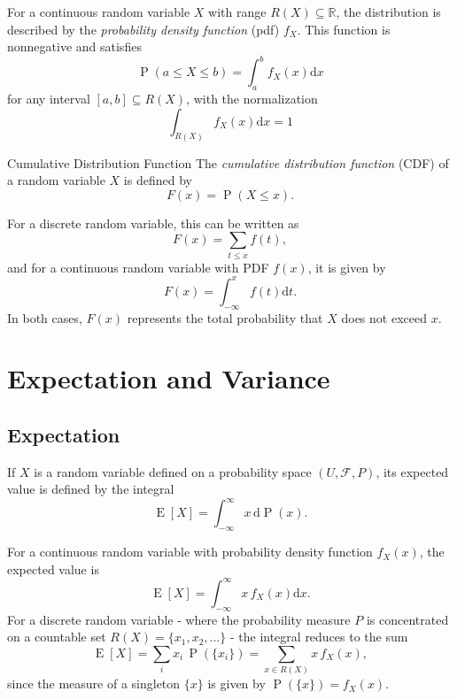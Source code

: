 \documentclass[11pt, headings=standardclasses, parskip=half, twoside]{scrartcl}
\newcommand{\dif}{\mathrm{d}}
\newcommand{\Prob}{\operatorname{P}}
\begin{document}
\begin{definition}{}
For a continuous random variable $X$ with range $R(X) \subseteq \mathbb{R}$, the distribution is described by the \textit{probability density function} (pdf) $f_{X}$. This function is nonnegative and satisfies
\[
\operatorname{P}(a \leq X \leq b)=\int_{a}^{b} f_{X}(x) \mathrm{d} x
\]
for any interval $[a, b] \subseteq R(X)$, with the normalization
\[
\int_{R(X)} f_{X}(x) \mathrm{d} x=1
\]
\end{definition}

\begin{definition}{Cumulative Distribution Function}{}
    The \textit{cumulative distribution function} (CDF) of a random variable $X$ is defined by
    \[
    F(x)=\operatorname{P}(X \leq x) .
    \]
\end{definition}

For a discrete random variable, this can be written as
\[
F(x)=\sum_{t \leq x} f(t),
\]
and for a continuous random variable with PDF $f(x)$, it is given by
\[
F(x)=\int_{-\infty}^{x} f(t) \mathrm{d} t .
\]
In both cases, $F(x)$ represents the total probability that $X$ does not exceed $x$.






\clearpage
\section{Expectation and Variance}

\subsection{Expectation}

\begin{definition}{}
    If $X$ is a random variable defined on a probability space $(U, \mathcal{F}, P)$, its expected value is defined by the integral
    \[
    \operatorname{E}[X]=\int_{-\infty}^{\infty} x \, \dif \Prob(x) .
    \]
\end{definition}

For a continuous random variable with probability density function $f_{X}(x)$, the expected value is
\[
\operatorname{E}[X]=\int_{-\infty}^{\infty} x \, f_{X}(x) \dif x.
\]
For a discrete random variable - where the probability measure $P$ is concentrated on a countable set $R(X)=\{x_{1}, x_{2}, \ldots\}$ - the integral reduces to the sum
\[
\operatorname{E}[X]=\sum_{i} x_{i} \, \operatorname{P}(\{x_{i}\})=\sum_{x \in R(X)} x \, f_{X}(x),
\]
since the measure of a singleton $\{x\}$ is given by $\operatorname{P}(\{x\})=f_{X}(x)$.
\end{document}
